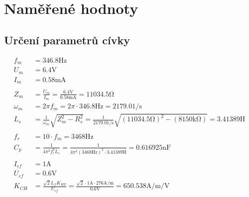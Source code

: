 \documentclass{article}
\begin{document}
\section{Naměřené hodnoty}
\subsection{Určení parametrů cívky}
$$
\begin{aligned}
	f_m &= 346.8 \si{\hertz}\\
	U_m &= 6.4 \si{\volt}\\
	I_m &= 0.58 \si{\milli\ampere}\\
	\\
	Z_m &= \frac{U_m}{I_m} = \frac{6.4 \si{\volt}}{0.58 \si{\milli\ampere}} = 11034.5 \si{\ohm}\\
	\omega_m &= 2\pi f_m = 2\pi \cdot 346.8 \si{\hertz} = 2179.01 \si{\per\second}\\
	L_s &= \frac{1}{\omega_m}\sqrt{Z_m^2-R_s^2}=\frac{1}{2179.01 \si{\per\second}}\sqrt{(11034.5 \si{\ohm})^2-(8150\si{\kilo\ohm})} = 3.41389 \si{\henry}\\
	\\
	f_r &= 10 \cdot f_m = 3468 \si{\hertz}\\
	C_p &= \frac{1}{4\pi^2f_r^2L_s} = \frac{1}{4\pi^2(3468 \si{\hertz})^2\cdot3.41389 \si{\henry}}=0.616925\si{\nano\farad}\\
	\\
	I_{ef} &= 1 \si{\ampere}\\
	U_{ef} &= 0.6 \si{\volt}\\
	K_{CH} &= \frac{\sqrt{2}I_{ef}K_{HZ}}{U_{ef}} = \frac{\sqrt{2}\cdot 1 \si{\ampere} \cdot 276 \si{\ampere\per\meter}}{0.6 \si{\volt}} = 650.538 \si{\ampere\per\meter\per\volt}
\end{aligned}
$$
\end{document}
